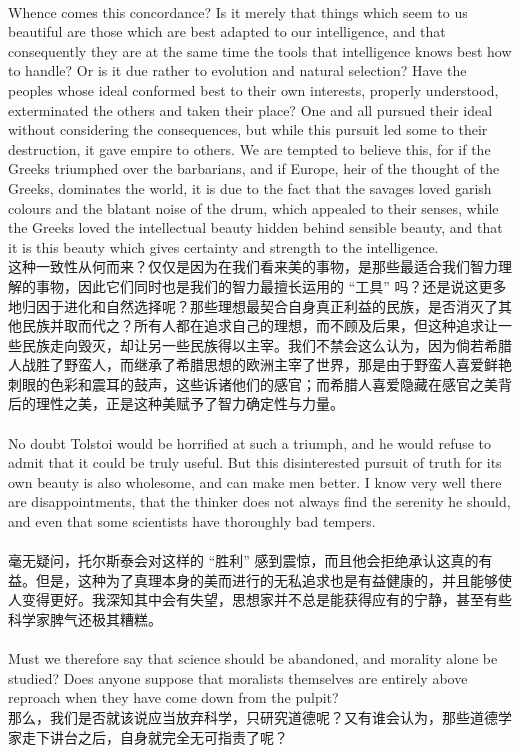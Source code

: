 \documentclass{article}
\begin{document}
\\
Whence comes this concordance? Is it merely that things which seem to us beautiful are those which are best adapted to our intelligence, and that consequently they are at the same time the tools that intelligence knows best how to handle? Or is it due rather to evolution and natural selection? Have the peoples whose ideal conformed best to their own interests, properly understood, exterminated the others and taken their place? One and all pursued their ideal without considering the consequences, but while this pursuit led some to their destruction, it gave empire to others. We are tempted to believe this, for if the Greeks triumphed over the barbarians, and if Europe, heir of the thought of the Greeks, dominates the world, it is due to the fact that the savages loved garish colours and the blatant noise of the drum, which appealed to their senses, while the Greeks loved the intellectual beauty hidden behind sensible beauty, and that it is this beauty which gives certainty and strength to the intelligence.\\
这种一致性从何而来？仅仅是因为在我们看来美的事物，是那些最适合我们智力理解的事物，因此它们同时也是我们的智力最擅长运用的 “工具” 吗？还是说这更多地归因于进化和自然选择呢？那些理想最契合自身真正利益的民族，是否消灭了其他民族并取而代之？所有人都在追求自己的理想，而不顾及后果，但这种追求让一些民族走向毁灭，却让另一些民族得以主宰。我们不禁会这么认为，因为倘若希腊人战胜了野蛮人，而继承了希腊思想的欧洲主宰了世界，那是由于野蛮人喜爱鲜艳刺眼的色彩和震耳的鼓声，这些诉诸他们的感官；而希腊人喜爱隐藏在感官之美背后的理性之美，正是这种美赋予了智力确定性与力量。\\ 

\\
No doubt Tolstoi would be horrified at such a triumph, and he would refuse to admit that it could be truly useful. But this disinterested pursuit of truth for its own beauty is also wholesome, and can make men better. I know very well there are disappointments, that the thinker does not always find the serenity he should, and even that some scientists have thoroughly bad tempers. \\\\
毫无疑问，托尔斯泰会对这样的 “胜利” 感到震惊，而且他会拒绝承认这真的有益。但是，这种为了真理本身的美而进行的无私追求也是有益健康的，并且能够使人变得更好。我深知其中会有失望，思想家并不总是能获得应有的宁静，甚至有些科学家脾气还极其糟糕。 \\

\\
Must we therefore say that science should be abandoned, and morality alone be studied? Does anyone suppose that moralists themselves are entirely above reproach when they have come down from the pulpit?\\
那么，我们是否就该说应当放弃科学，只研究道德呢？又有谁会认为，那些道德学家走下讲台之后，自身就完全无可指责了呢？ \\
\end{document}
